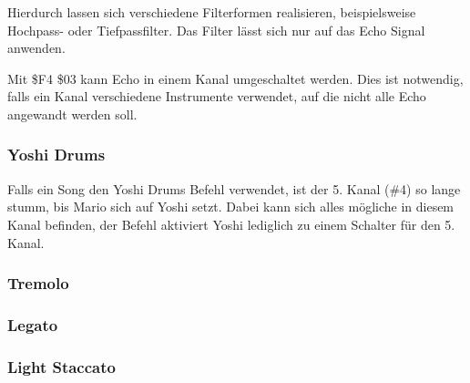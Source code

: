\medskip

Hierdurch lassen sich verschiedene Filterformen realisieren, beispielsweise Hochpass- oder Tiefpassfilter.
Das Filter lässt sich nur auf das Echo Signal anwenden.

\bigskip

Mit \$F4 \$03 kann Echo in einem Kanal umgeschaltet werden. Dies ist notwendig, falls ein Kanal verschiedene Instrumente verwendet, auf die nicht alle Echo angewandt werden soll.

\subsubsection{Yoshi Drums}

Falls ein Song den Yoshi Drums Befehl verwendet, ist der 5. Kanal (\#4) so lange stumm, bis Mario sich auf Yoshi setzt. Dabei kann sich alles mögliche in diesem Kanal befinden, der Befehl aktiviert Yoshi lediglich zu einem Schalter für den 5. Kanal.
\medskip



\medskip



\subsubsection{Tremolo}
\subsubsection{Legato}
\subsubsection{Light Staccato}
